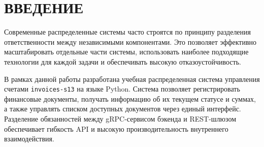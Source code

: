 \section*{ВВЕДЕНИЕ}

Современные распределенные системы часто строятся по принципу разделения ответственности между независимыми компонентами. Это позволяет эффективно масштабировать отдельные части системы, использовать наиболее подходящие технологии для каждой задачи и обеспечивать высокую отказоустойчивость.

В рамках данной работы разработана учебная распределенная система управления счетами \texttt{invoices-s13} на языке Python. Система позволяет регистрировать финансовые документы, получать информацию об их текущем статусе и суммах, а также управлять списком доступных документов через единый интерфейс. Разделение обязанностей между gRPC-сервисом бэкенда и REST-шлюзом обеспечивает гибкость API и высокую производительность внутреннего взаимодействия.
